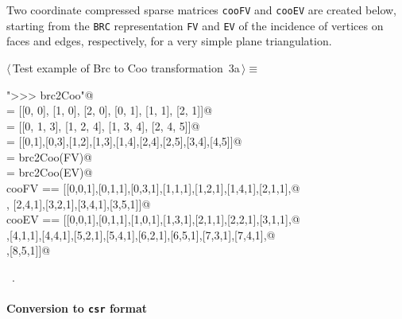\documentclass[11pt,oneside]{article}	%
\begin{document}
Two coordinate compressed sparse matrices \texttt{cooFV} and \texttt{cooEV} are created below, starting from the \texttt{BRC} representation \texttt{FV} and \texttt{EV} of the incidence of vertices on faces and edges, respectively, for a very simple plane triangulation.
\begin{flushleft} \small \label{scrap2}
\protect{}$\langle\,$Test example of Brc to Coo transformation\nobreak\ {\footnotesize 3a}$\,\rangle\equiv$
\vspace{-1ex}
\begin{list}{}{} \item
\mbox{}\verb@print "\n>>> brc2Coo"@\\
\mbox{}\verb@V = [[0, 0], [1, 0], [2, 0], [0, 1], [1, 1], [2, 1]]@\\
\mbox{}\verb@FV = [[0, 1, 3], [1, 2, 4], [1, 3, 4], [2, 4, 5]]@\\
\mbox{}\verb@EV = [[0,1],[0,3],[1,2],[1,3],[1,4],[2,4],[2,5],[3,4],[4,5]]@\\
\mbox{}\verb@cooFV = brc2Coo(FV)@\\
\mbox{}\verb@cooEV = brc2Coo(EV)@\\
\mbox{}\verb@assert cooFV == [[0,0,1],[0,1,1],[0,3,1],[1,1,1],[1,2,1],[1,4,1],[2,1,1],@\\
\mbox{}\verb@[2,3,1], [2,4,1],[3,2,1],[3,4,1],[3,5,1]]@\\
\mbox{}\verb@assert cooEV == [[0,0,1],[0,1,1],[1,0,1],[1,3,1],[2,1,1],[2,2,1],[3,1,1],@\\
\mbox{}\verb@[3,3,1],[4,1,1],[4,4,1],[5,2,1],[5,4,1],[6,2,1],[6,5,1],[7,3,1],[7,4,1],@\\
\mbox{}\verb@[8,4,1],[8,5,1]]@\\
\mbox{}\verb@@{\NWsep}
\end{list}
\vspace{-1ex}
\footnotesize\addtolength{\baselineskip}{-1ex}
\begin{list}{}{\setlength{\itemsep}{-\parsep}\setlength{\itemindent}{-\leftmargin}}
\item \NWtxtMacroRefIn\ .
\end{list}
\end{flushleft}
\paragraph{Conversion to \texttt{csr} format}
\end{document}
